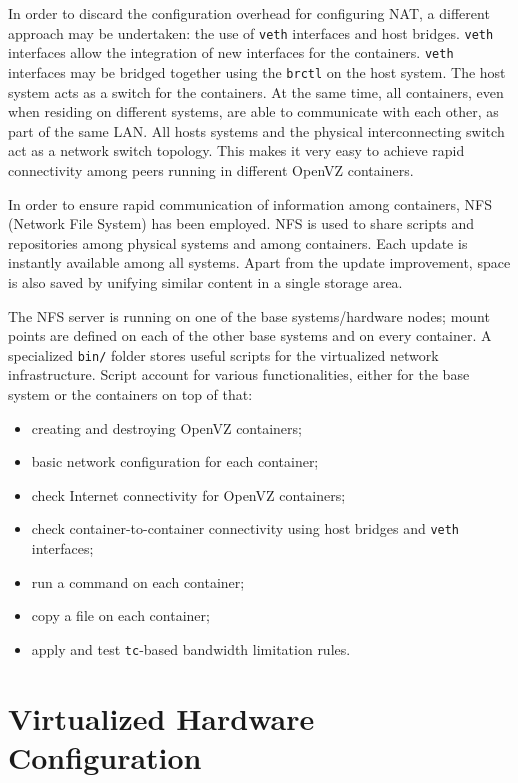 In order to discard the configuration overhead for configuring NAT, a
different approach may be undertaken: the use of \texttt{veth} interfaces and
host bridges. \texttt{veth} interfaces allow the integration of new interfaces
for the containers. \texttt{veth} interfaces may be bridged together using the
\texttt{brctl} on the host system. The host system acts as a switch for the
containers. At the same time, all containers, even when residing on different
systems, are able to communicate with each other, as part of the same LAN. All
hosts systems and the physical interconnecting switch act as a network switch
topology. This makes it very easy to achieve rapid connectivity among peers
running in different OpenVZ containers.

In order to ensure rapid communication of information among containers, NFS
(Network File System) has been employed. NFS is used to share scripts and
repositories among physical systems and among containers. Each update is
instantly available among all systems. Apart from the update improvement,
space is also saved by unifying similar content in a single storage area.

The NFS server is running on one of the base systems/hardware nodes; mount
points are defined on each of the other base systems and on every container. A
specialized \texttt{bin/} folder stores useful scripts for the virtualized
network infrastructure. Script account for various functionalities, either for
the base system or the containers on top of that:

\begin{itemize}
  \item creating and destroying OpenVZ containers;
  \item basic network configuration for each container;
  \item check Internet connectivity for OpenVZ containers;
  \item check container-to-container connectivity using host bridges and
  \texttt{veth} interfaces;
  \item run a command on each container;
  \item copy a file on each container;
  \item apply and test \texttt{tc}-based bandwidth limitation rules.
\end{itemize}

\section{Virtualized Hardware Configuration}
\label{sec:virt-hwconf}

